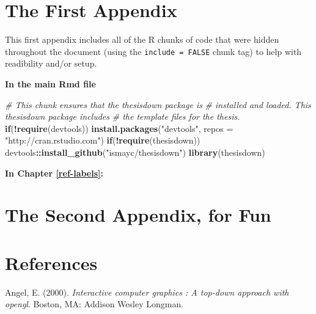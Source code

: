 \documentclass[12pt,twoside]{reedthesis}
\newenvironment{Shaded}{\begin{snugshade}}{\end{snugshade}}
\newcommand{\KeywordTok}[1]{\textcolor[rgb]{0.13,0.29,0.53}{\textbf{#1}}}
\newcommand{\DataTypeTok}[1]{\textcolor[rgb]{0.13,0.29,0.53}{#1}}
\newcommand{\StringTok}[1]{\textcolor[rgb]{0.31,0.60,0.02}{#1}}
\newcommand{\CommentTok}[1]{\textcolor[rgb]{0.56,0.35,0.01}{\textit{#1}}}
\newcommand{\ControlFlowTok}[1]{\textcolor[rgb]{0.13,0.29,0.53}{\textbf{#1}}}
\newcommand{\OperatorTok}[1]{\textcolor[rgb]{0.81,0.36,0.00}{\textbf{#1}}}
\newcommand{\NormalTok}[1]{#1}
\begin{document}
\appendix

\chapter{The First Appendix}\label{the-first-appendix}

This first appendix includes all of the R chunks of code that were
hidden throughout the document (using the \texttt{include\ =\ FALSE}
chunk tag) to help with readibility and/or setup.

\textbf{In the main Rmd file}
\begin{Shaded}
\begin{Highlighting}[]
\CommentTok{# This chunk ensures that the thesisdown package is}
\CommentTok{# installed and loaded. This thesisdown package includes}
\CommentTok{# the template files for the thesis.}
\ControlFlowTok{if}\NormalTok{(}\OperatorTok{!}\KeywordTok{require}\NormalTok{(devtools))}
  \KeywordTok{install.packages}\NormalTok{(}\StringTok{"devtools"}\NormalTok{, }\DataTypeTok{repos =} \StringTok{"http://cran.rstudio.com"}\NormalTok{)}
\ControlFlowTok{if}\NormalTok{(}\OperatorTok{!}\KeywordTok{require}\NormalTok{(thesisdown))}
\NormalTok{  devtools}\OperatorTok{::}\KeywordTok{install_github}\NormalTok{(}\StringTok{"ismayc/thesisdown"}\NormalTok{)}
\KeywordTok{library}\NormalTok{(thesisdown)}
\end{Highlighting}
\end{Shaded}
\textbf{In Chapter \ref{ref-labels}:}

\chapter{The Second Appendix, for
Fun}\label{the-second-appendix-for-fun}

\backmatter

\chapter*{References}\label{references}


\noindent

\setlength{\parindent}{-0.20in} \setlength{\leftskip}{0.20in}
\setlength{\parskip}{8pt}

\hypertarget{refs}{}
\hypertarget{ref-angel2000}{}
Angel, E. (2000). \emph{Interactive computer graphics : A top-down
approach with opengl}. Boston, MA: Addison Wesley Longman.
\end{document}
